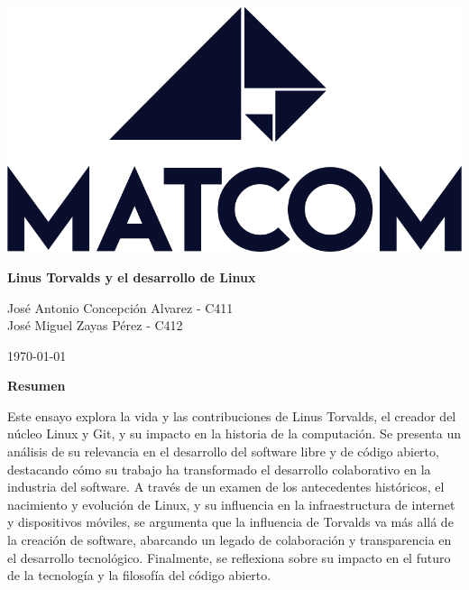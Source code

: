 \documentclass[a4paper,12pt]{article}
\begin{document}
\begin{titlepage}
    \centering
    

    \vspace{1cm}
    \newpage
    \begin{center}
        \includegraphics[scale=0.2]{images/Matcom-UnaTinta-Black.png}
    \end{center}
    
    {\Huge \textbf{Linus Torvalds y el desarrollo de Linux}}\\
    \vspace{0.5cm}
    
    {\Large José Antonio Concepción Alvarez - C411 \\  José Miguel Zayas Pérez - C412\\ }
    \vspace{0.5cm}
    
    {\large \today}
   \thispagestyle{empty} 
\end{titlepage}




\vspace{2cm}
\begin{centering}
    \textbf{Resumen}\\
\end{centering}
    Este ensayo explora la vida y las contribuciones de Linus Torvalds, el
    creador del núcleo Linux y Git, y su impacto en la historia de la
    computación. Se presenta un análisis de su relevancia en el desarrollo del
    software libre y de código abierto, destacando cómo su trabajo ha
    transformado el desarrollo colaborativo en la industria del software. A
    través de un examen de los antecedentes históricos, el nacimiento y
    evolución de Linux, y su influencia en la infraestructura de internet y
    dispositivos móviles, se argumenta que la influencia de Torvalds va más allá
    de la creación de software, abarcando un legado de colaboración y
    transparencia en el desarrollo tecnológico. Finalmente, se reflexiona sobre
    su impacto en el futuro de la tecnología y la filosofía del código abierto.
\end{document}
